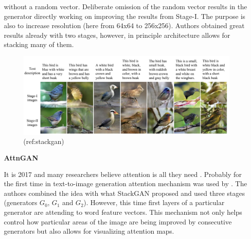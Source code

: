 \documentclass[
]{krantz}
\begin{document}
without a random vector. Deliberate omission of the random vector results in the generator directly working on improving the results from Stage-I. The purpose is also to increase resolution (here from 64x64 to 256x256). Authors obtained great results already with two stages, however, in principle architecture allows for stacking many of them.

\begin{figure}

{\centering \includegraphics[width=1\linewidth]{figures/02-02-text-2-img/stackgan} 

}

\caption{(ref:stackgan)}\label{fig:stackgan}
\end{figure}



\textbf{AttnGAN}

It is 2017 and many researchers believe attention is all they need \citep{AttentionIsAllYouNeed2017}. Probably for the first time in text-to-image generation attention mechanism was used by \citet{AttnGAN2017}. The authors combined the idea with what StackGAN proposed and used three stages (generators \(G_{0}\), \(G_{1}\) and \(G_{2}\)). However, this time first layers of a particular generator are attending to word feature vectors. This mechanism not only helps control how particular areas of the image are being improved by consecutive generators but also allows for visualizing attention maps.
\end{document}
